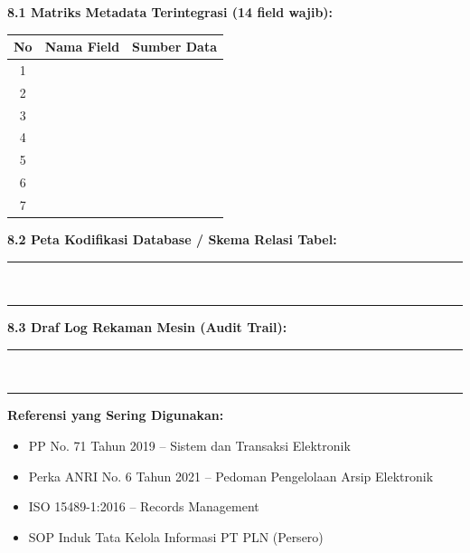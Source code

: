\documentclass[12pt,a4paper]{report}
\newcommand{\fillline}[1][6cm]{\underline{\hspace{#1}}}
\newcommand{\writespace}[1][2cm]{\rule{0pt}{#1}}
\begin{document}
\begin{tcolorbox}[colback=plnblue!3, colframe=plnblue!60, sharp corners, title={\small\bfseries Komponen 8: Lampiran Teknis (Matriks Metadata, Peta DB, \& Audit Trail)}, boxrule=0.8pt]
\small
\noindent\textbf{8.1 Matriks Metadata Terintegrasi (14 field wajib):}\\[0.15cm]
\renewcommand{\arraystretch}{1.3}
\begin{tabularx}{\textwidth}{@{} c X c @{}}
\toprule
\textbf{No} & \textbf{Nama Field} & \textbf{Sumber Data} \\
\midrule
1 & \fillline[6cm] & \fillline[3cm] \\
2 & \fillline[6cm] & \fillline[3cm] \\
3 & \fillline[6cm] & \fillline[3cm] \\
4 & \fillline[6cm] & \fillline[3cm] \\
5 & \fillline[6cm] & \fillline[3cm] \\
6 & \fillline[6cm] & \fillline[3cm] \\
7 & \fillline[6cm] & \fillline[3cm] \\
\bottomrule
\end{tabularx}
\renewcommand{\arraystretch}{1.0}

\vspace{0.3cm}
\noindent\textbf{8.2 Peta Kodifikasi Database / Skema Relasi Tabel:}\\
\rule{\textwidth}{0.3pt}\writespace[0.7cm]\\
\rule{\textwidth}{0.3pt}

\vspace{0.3cm}
\noindent\textbf{8.3 Draf Log Rekaman Mesin (Audit Trail):}\\
\rule{\textwidth}{0.3pt}\writespace[0.7cm]\\
\rule{\textwidth}{0.3pt}
\end{tcolorbox}

\vspace{0.4cm}

\begin{tipbox}
\textbf{Referensi yang Sering Digunakan:}
\begin{itemize}
    \item PP No. 71 Tahun 2019 -- Sistem dan Transaksi Elektronik
    \item Perka ANRI No. 6 Tahun 2021 -- Pedoman Pengelolaan Arsip Elektronik
    \item ISO 15489-1:2016 -- Records Management
    \item SOP Induk Tata Kelola Informasi PT PLN (Persero)
\end{itemize}
\end{tipbox}
\end{document}
